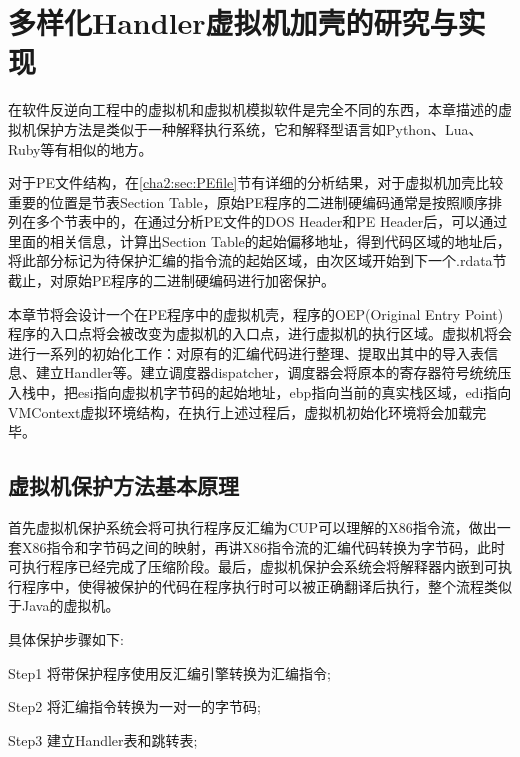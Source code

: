 \chapter{多样化Handler虚拟机加壳的研究与实现}

在软件反逆向工程中的虚拟机和虚拟机模拟软件是完全不同的东西，本章描述的虚拟机保护方法是类似于一种解释执行系统，它和解释型语言如Python、Lua、Ruby等有相似的地方。

对于PE文件结构，在\ref{cha2:sec:PEfile}节有详细的分析结果，对于虚拟机加壳比较重要的位置是节表Section Table，原始PE程序的二进制硬编码通常是按照顺序排列在多个节表中的，在通过分析PE文件的DOS Header和PE Header后，可以通过里面的相关信息，计算出Section Table的起始偏移地址，得到代码区域的地址后，将此部分标记为待保护汇编的指令流的起始区域，由次区域开始到下一个.rdata节截止，对原始PE程序的二进制硬编码进行加密保护。



本章节将会设计一个在PE程序中的虚拟机壳，程序的OEP(Original Entry Point)程序的入口点将会被改变为虚拟机的入口点，进行虚拟机的执行区域。虚拟机将会进行一系列的初始化工作：对原有的汇编代码进行整理、提取出其中的导入表信息、建立Handler等。建立调度器dispatcher，调度器会将原本的寄存器符号统统压入栈中，把esi指向虚拟机字节码的起始地址，ebp指向当前的真实栈区域，edi指向VMContext虚拟环境结构，在执行上述过程后，虚拟机初始化环境将会加载完毕。



\section{虚拟机保护方法基本原理}


首先虚拟机保护系统会将可执行程序反汇编为CUP可以理解的X86指令流，做出一套X86指令和字节码之间的映射，再讲X86指令流的汇编代码转换为字节码，此时可执行程序已经完成了压缩阶段。最后，虚拟机保护会系统会将解释器内嵌到可执行程序中，使得被保护的代码在程序执行时可以被正确翻译后执行，整个流程类似于Java的虚拟机。

具体保护步骤如下:

Step1 将带保护程序使用反汇编引擎转换为汇编指令;

Step2 将汇编指令转换为一对一的字节码;

Step3 建立Handler表和跳转表;

